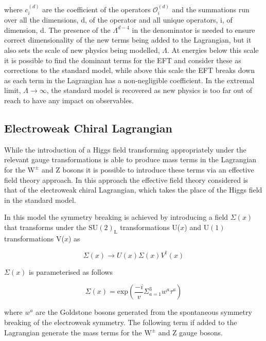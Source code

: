 where $c_{i}^{(d)}$ are the coefficient of the operators $\mathcal{O}_{i}^{(d)}$ and the summations run over all the dimensions, d, of the operator and all unique operators, i, of dimension, d.  The presence of the $\Lambda^{d-4}$ in the denominator is needed to ensure correct dimensionality of the new terms being added to the Lagrangian, but it also sets the scale of  new physics being modelled, $\Lambda$.  At energies below this scale it is possible to find the dominant terms for the EFT and consider these as corrections to the standard model, while above this scale the EFT breaks down as each term in the Lagrangian has a non-negligible coefficient.  In the extremal limit, $\Lambda \rightarrow \infty$, the standard model is recovered as new physics is too far out of reach to have any impact on observables.


\subsection{Electroweak Chiral Lagrangian}
While the introduction of a Higgs field transforming appropriately under the relevant gauge transformations is able to produce mass terms in the Lagrangian for the $\text{W}^{\pm}$ and Z bosons it is possible to introduce these terms via an effective field theory approach.  In this approach the effective field theory considered is that of the electroweak chiral Lagrangian, which takes the place of the Higgs field in the standard model.  

In this model the symmetry breaking is achieved by introducing a field $\Sigma(x)$ that transforms under the $\text{SU}(2)_{\text{L}}$ transformations U($x$) and $\text{U}(1)$ transformations V($x$) as

\begin{equation}
\Sigma(x) \rightarrow U(x) \Sigma(x) V^{\dagger}(x)
\end{equation}

$\Sigma(x)$ is parameterised as follows

\begin{equation}
\Sigma(x) = \text{exp} (\frac{-i}{v} \Sigma^{3}_{a=1} w^{a}\tau^{a})
\end{equation}

where $w^{a}$ are the Goldstone bosons generated from the spontaneous symmetry breaking of the electroweak symmetry.  The following term if added to the Lagrangian generate the mass terms for the $\text{W}^{\pm}$ and Z gauge bosons.

